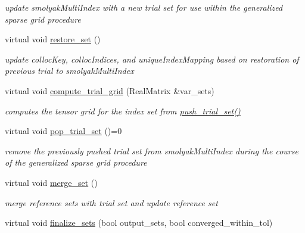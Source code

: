 \begin{DoxyCompactItemize}
\begin{DoxyCompactList}\small\item\em update smolyak\+Multi\+Index with a new trial set for use within the generalized sparse grid procedure \end{DoxyCompactList}\item 
virtual void \hyperlink{classPecos_1_1SparseGridDriver_ad9648693eacbe856825d2c78b73a3301}{restore\+\_\+set} ()\label{classPecos_1_1SparseGridDriver_ad9648693eacbe856825d2c78b73a3301}

\begin{DoxyCompactList}\small\item\em update colloc\+Key, colloc\+Indices, and unique\+Index\+Mapping based on restoration of previous trial to smolyak\+Multi\+Index \end{DoxyCompactList}\item 
virtual void \hyperlink{classPecos_1_1SparseGridDriver_a392163a55c3c5c2b4357b5490009df62}{compute\+\_\+trial\+\_\+grid} (Real\+Matrix \&var\+\_\+sets)\label{classPecos_1_1SparseGridDriver_a392163a55c3c5c2b4357b5490009df62}

\begin{DoxyCompactList}\small\item\em computes the tensor grid for the index set from \hyperlink{classPecos_1_1SparseGridDriver_a0d967c54a2f89a28ac1c406a5aaaae07}{push\+\_\+trial\+\_\+set()} \end{DoxyCompactList}\item 
virtual void \hyperlink{classPecos_1_1SparseGridDriver_a717b7cd79eb261eb0979b0f974add05f}{pop\+\_\+trial\+\_\+set} ()=0\label{classPecos_1_1SparseGridDriver_a717b7cd79eb261eb0979b0f974add05f}

\begin{DoxyCompactList}\small\item\em remove the previously pushed trial set from smolyak\+Multi\+Index during the course of the generalized sparse grid procedure \end{DoxyCompactList}\item 
virtual void \hyperlink{classPecos_1_1SparseGridDriver_a9719b2ab5ff3d7f099fe721a2d7fc6b0}{merge\+\_\+set} ()\label{classPecos_1_1SparseGridDriver_a9719b2ab5ff3d7f099fe721a2d7fc6b0}

\begin{DoxyCompactList}\small\item\em merge reference sets with trial set and update reference set \end{DoxyCompactList}\item 
virtual void \hyperlink{classPecos_1_1SparseGridDriver_a07e01bf89eb07535ea78132b8d533088}{finalize\+\_\+sets} (bool output\+\_\+sets, bool converged\+\_\+within\+\_\+tol)\label{classPecos_1_1SparseGridDriver_a07e01bf89eb07535ea78132b8d533088}


\end{DoxyCompactItemize}
